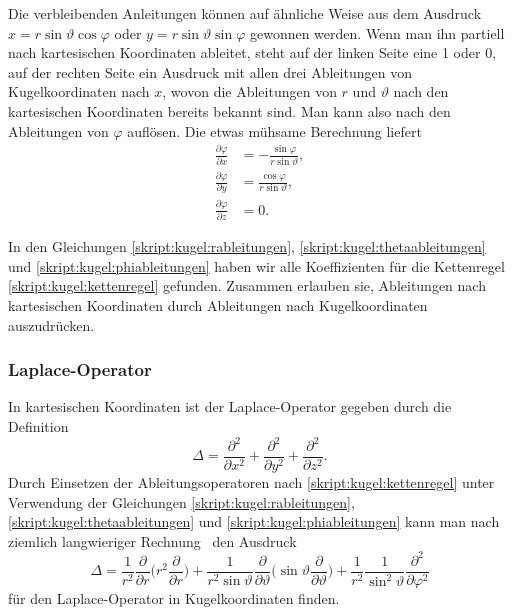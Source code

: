 Die verbleibenden Anleitungen können auf ähnliche Weise aus dem Ausdruck
$x=r\sin\vartheta\cos\varphi$
oder
$y=r\sin\vartheta\sin\varphi$
gewonnen werden.
Wenn man ihn partiell nach kartesischen Koordinaten ableitet,
steht auf der linken Seite eine 1 oder 0,
auf der rechten Seite ein Ausdruck mit allen drei Ableitungen von
Kugelkoordinaten nach $x$, wovon die Ableitungen von $r$ und $\vartheta$
nach den kartesischen Koordinaten bereits bekannt sind.
Man kann also nach den Ableitungen von $\varphi$ auflösen.
Die etwas mühsame Berechnung liefert
\begin{equation}
\begin{aligned}
\frac{\partial \varphi}{\partial x}
&=
-\frac{\sin\varphi}{r\sin\vartheta},
\\
\frac{\partial \varphi}{\partial y}
&=
\frac{\cos\varphi}{r\sin\vartheta},
\\
\frac{\partial \varphi}{\partial z}
&=
0.
\end{aligned}
\label{skript:kugel:phiableitungen}
\end{equation}

In den Gleichungen
\eqref{skript:kugel:rableitungen},
\eqref{skript:kugel:thetaableitungen}
und
\eqref{skript:kugel:phiableitungen}
haben wir alle Koeffizienten für die Kettenregel
\eqref{skript:kugel:kettenregel}
gefunden.
Zusammen erlauben sie, Ableitungen nach kartesischen Koordinaten
durch Ableitungen nach Kugelkoordinaten auszudrücken.

\subsubsection{Laplace-Operator}
In kartesischen Koordinaten ist der Laplace-Operator gegeben durch die
Definition
\[
\Delta
=
\frac{\partial^2}{\partial x^2}
+
\frac{\partial^2}{\partial y^2}
+
\frac{\partial^2}{\partial z^2}.
\]
Durch Einsetzen der Ableitungsoperatoren nach
\eqref{skript:kugel:kettenregel} unter Verwendung der Gleichungen
\eqref{skript:kugel:rableitungen},
\eqref{skript:kugel:thetaableitungen}
und
\eqref{skript:kugel:phiableitungen}
kann man nach ziemlich langwieriger
Rechnung~\cite[Anhang B.3]{skript:mathsem-qm}
den Ausdruck
\begin{equation}
\Delta
=
\frac1{r^2}\frac{\partial}{\partial r}
\biggl(r^2\frac{\partial}{\partial r}\biggr)
+
\frac{1}{r^2\sin\vartheta}\frac{\partial}{\partial\vartheta}
\biggl(\sin\vartheta\frac{\partial}{\partial\vartheta}\biggr)
+
\frac{1}{r^2}
\frac{1}{\sin^2\vartheta}
\frac{\partial^2}{\partial\varphi^2}
\end{equation}
für den Laplace-Operator in Kugelkoordinaten finden.
%

